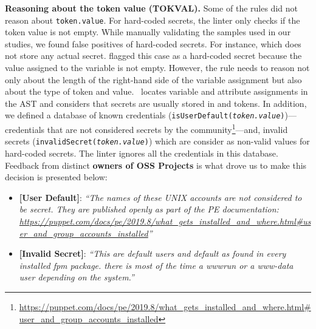 \textbf{Reasoning about the token value (TOKVAL).} Some of the rules did not 
reason about \texttt{token.value}. For hard-coded secrets, 
the linter only checks if the token value is not empty. While manually validating the 
samples used in our studies, we found false positives of hard-coded secrets. For instance, 
 which does not store 
any actual secret. \slic{} flagged this case as a hard-coded secret because the value assigned 
to the variable  is not empty. However, the rule needs to 
reason not only about the length of the right-hand side of the variable assignment but also about 
the type of token and value. \toolname\ locates variable and attribute assignments in the AST and considers 
that secrets are usually stored in  and  tokens. In addition, we defined a database
of known credentials (\texttt{isUserDefault(\textit{token.value})})---credentials that are not 
considered secrets by the community\footnote{\url{https://puppet.com/docs/pe/2019.8/what\_gets\_installed\_and\_where.html\#user\_and\_group\_accounts\_installed}}---and,
invalid secrets (\texttt{invalidSecret(\textit{token.value})}) which are 
consider as non-valid values for hard-coded secrets. The linter ignores all the credentials in this database. Feedback from distinct \textbf{owners of OSS Projects} is what
drove us to make this decision is presented below:

\begin{itemize}[topsep=.2ex,itemsep=.2ex,leftmargin=0em]
  \item[] \textbf{[User Default]}: 
  \textit{``The names of these UNIX accounts are not 
  considered to be secret. They are 
  published openly as part of the PE documentation:
  \url{https://puppet.com/docs/pe/2019.8/what\_gets\_installed\_and\_where.html\#user\_and\_group\_accounts\_installed}''}
  \item[] \textbf{[Invalid Secret]}: 
  \textit{``This are default users and default as found in every installed 
  fpm package. there is most of the time a wwwrun or a www-data user 
  depending on the system.''}
\end{itemize}

